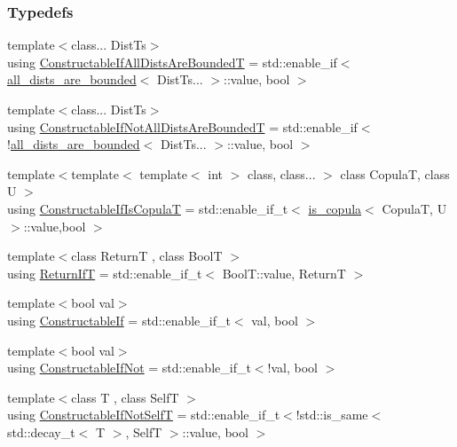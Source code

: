 \subsubsection*{Typedefs}
\begin{DoxyCompactItemize}
\item 
{\footnotesize template$<$class... Dist\+Ts$>$ }\\using \hyperlink{namespaceprior__hessian_1_1meta_a1f28a9142fc5442b2ba3cf722169578a}{Constructable\+If\+All\+Dists\+Are\+BoundedT} = std\+::enable\+\_\+if$<$ \hyperlink{structprior__hessian_1_1meta_1_1all__dists__are__bounded}{all\+\_\+dists\+\_\+are\+\_\+bounded}$<$ Dist\+Ts... $>$\+::value, bool $>$
\item 
{\footnotesize template$<$class... Dist\+Ts$>$ }\\using \hyperlink{namespaceprior__hessian_1_1meta_a33414fea85f38ec07f5b6a750be5656b}{Constructable\+If\+Not\+All\+Dists\+Are\+BoundedT} = std\+::enable\+\_\+if$<$!\hyperlink{structprior__hessian_1_1meta_1_1all__dists__are__bounded}{all\+\_\+dists\+\_\+are\+\_\+bounded}$<$ Dist\+Ts... $>$\+::value, bool $>$
\item 
{\footnotesize template$<$template$<$ template$<$ int $>$ class, class... $>$ class CopulaT, class U $>$ }\\using \hyperlink{namespaceprior__hessian_1_1meta_a18d532e255e9785cca33c9bf8b932adf}{Constructable\+If\+Is\+CopulaT} = std\+::enable\+\_\+if\+\_\+t$<$ \hyperlink{classprior__hessian_1_1meta_1_1is__copula}{is\+\_\+copula}$<$ CopulaT, U $>$\+::value,bool $>$
\item 
{\footnotesize template$<$class ReturnT , class BoolT $>$ }\\using \hyperlink{namespaceprior__hessian_1_1meta_a3fb9317007d5f1b3825cbfd69d491374}{Return\+IfT} = std\+::enable\+\_\+if\+\_\+t$<$ Bool\+T\+::value, ReturnT $>$
\item 
{\footnotesize template$<$bool val$>$ }\\using \hyperlink{namespaceprior__hessian_1_1meta_aa8f9847c6c56ca1f8530657d74bb9a99}{Constructable\+If} = std\+::enable\+\_\+if\+\_\+t$<$ val, bool $>$
\item 
{\footnotesize template$<$bool val$>$ }\\using \hyperlink{namespaceprior__hessian_1_1meta_a23667341714ecaa72ef51dafae35ee60}{Constructable\+If\+Not} = std\+::enable\+\_\+if\+\_\+t$<$!val, bool $>$
\item 
{\footnotesize template$<$class T , class SelfT $>$ }\\using \hyperlink{namespaceprior__hessian_1_1meta_a1aa5afbb3de8629472e4cd3fbabf13ae}{Constructable\+If\+Not\+SelfT} = std\+::enable\+\_\+if\+\_\+t$<$!std\+::is\+\_\+same$<$ std\+::decay\+\_\+t$<$ T $>$, SelfT $>$\+::value, bool $>$

\end{DoxyCompactItemize}
